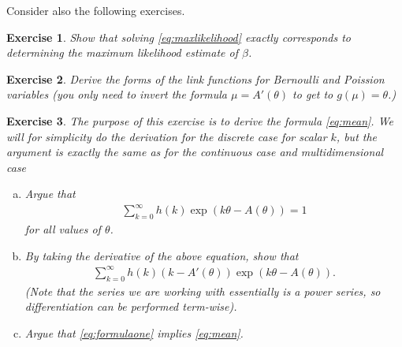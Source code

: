 \documentclass{article}
\newtheorem{exercise}{Exercise}
\begin{document}
 Consider also the following exercises.

\begin{exercise}
    Show that solving \eqref{eq:maxlikelihood} exactly corresponds to determining the maximum likelihood estimate of $\beta$.
\end{exercise}

\begin{exercise}
    Derive the forms of the link functions for Bernoulli and Poission variables (you only need to invert the formula  $\mu = A'(\theta)$ to get to $g(\mu)=\theta$.)
\end{exercise}

\begin{exercise}
    The purpose of this exercise is to derive the formula \ref{eq:mean}. We will for simplicity do the derivation for the discrete case for scalar $k$, but the argument is exactly the same as for the continuous case and multidimensional case

    \begin{enumerate}[(a)]
        \item Argue that
        \begin{align*}
            \sum_{k=0}^\infty h(k) \exp(k\theta-A(\theta)) =1
        \end{align*}
        for all values of $\theta$.
        \item By taking the derivative of the above equation, show that
        \begin{align} \label{eq:formulaone}
            \sum_{k=0}^\infty h(k)(k-A'(\theta))\exp(k\theta-A(\theta)).
        \end{align}
       (Note that the series we are working with essentially is a power series, so differentiation can be performed term-wise).
        \item Argue that \eqref{eq:formulaone} implies \eqref{eq:mean}.
    \end{enumerate}
\end{exercise}
\end{document}
